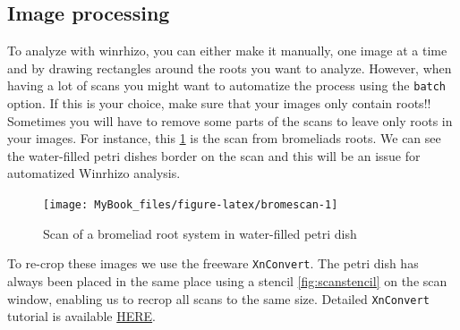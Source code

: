 \documentclass[
  12pt,
  american,
  a4paper,
  extrafontsizes,onecolumn,openright
  ]{memoir}
\begin{document}
\normalsize

\hypertarget{image-processing}{%
\subsection{Image processing}\label{image-processing}}

To analyze with winrhizo, you can either make it manually, one image at a time and by drawing rectangles around the roots you want to analyze.
However, when having a lot of scans you might want to automatize the process using the \texttt{batch} option.
If this is your choice, make sure that your images only contain roots!! Sometimes you will have to remove some parts of the scans to leave only roots in your images.
For instance, this \ref{fig:bromescan} is the scan from bromeliads roots. We can see the water-filled petri dishes border on the scan and this will be an issue for automatized Winrhizo analysis.

\scriptsize

\begin{figure}

{\centering \texttt{[image: MyBook\_files/figure-latex/bromescan-1]} 

}

\caption{Scan of a bromeliad root system in water-filled petri dish}\label{fig:bromescan}
\end{figure}

\normalsize

To re-crop these images we use the freeware \texttt{XnConvert}. The petri dish has always been placed in the same place using a stencil \ref{fig:scanstencil} on the scan window, enabling us to recrop all scans to the same size.
Detailed \texttt{XnConvert} tutorial is available \href{document/software/XnConvert/test.txt}{HERE}.

\scriptsize
\end{document}
